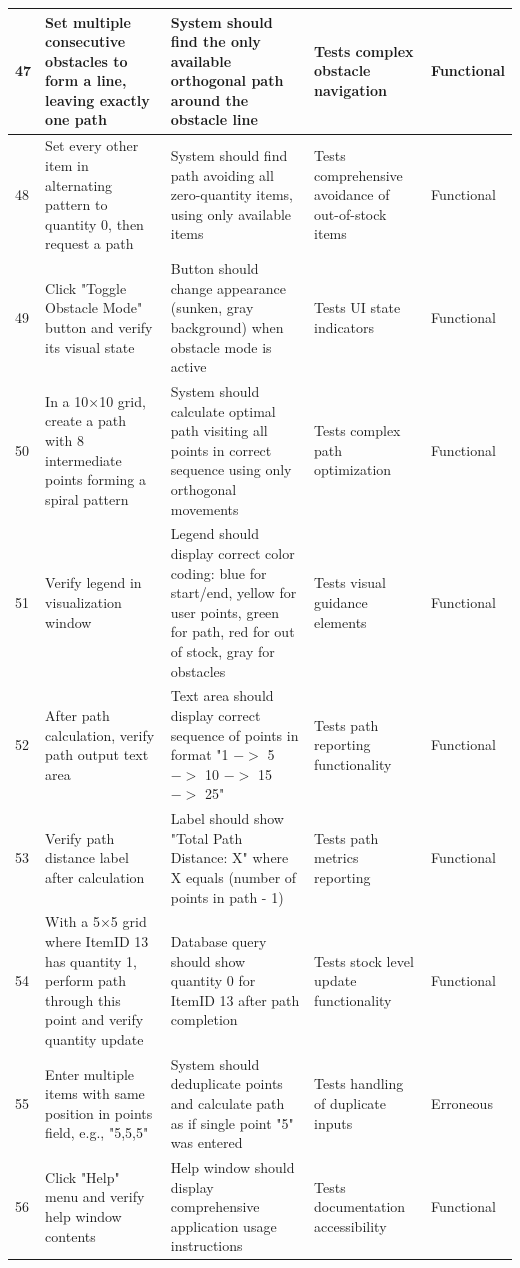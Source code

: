 \begin{longtable}{|p{}|p{}|p{}|p{}|p{}|}
\hline
47 & Set multiple consecutive obstacles to form a line, leaving exactly one path & System should find the only available orthogonal path around the obstacle line & Tests complex obstacle navigation & Functional \\
\hline
48 & Set every other item in alternating pattern to quantity 0, then request a path & System should find path avoiding all zero-quantity items, using only available items & Tests comprehensive avoidance of out-of-stock items & Functional \\
\hline
49 & Click "Toggle Obstacle Mode" button and verify its visual state & Button should change appearance (sunken, gray background) when obstacle mode is active & Tests UI state indicators & Functional \\
\hline
50 & In a 10×10 grid, create a path with 8 intermediate points forming a spiral pattern & System should calculate optimal path visiting all points in correct sequence using only orthogonal movements & Tests complex path optimization & Functional \\
\hline
51 & Verify legend in visualization window & Legend should display correct color coding: blue for start/end, yellow for user points, green for path, red for out of stock, gray for obstacles & Tests visual guidance elements & Functional \\
\hline
52 & After path calculation, verify path output text area & Text area should display correct sequence of points in format "1 $->$ 5 $->$ 10 $->$ 15 $->$ 25" & Tests path reporting functionality & Functional \\
\hline
53 & Verify path distance label after calculation & Label should show "Total Path Distance: X" where X equals (number of points in path - 1) & Tests path metrics reporting & Functional \\
\hline
54 & With a 5×5 grid where ItemID 13 has quantity 1, perform path through this point and verify quantity update & Database query should show quantity 0 for ItemID 13 after path completion & Tests stock level update functionality & Functional \\
\hline
55 & Enter multiple items with same position in points field, e.g., "5,5,5" & System should deduplicate points and calculate path as if single point "5" was entered & Tests handling of duplicate inputs & Erroneous \\
\hline
56 & Click "Help" menu and verify help window contents & Help window should display comprehensive application usage instructions & Tests documentation accessibility & Functional \\

\end{longtable}
